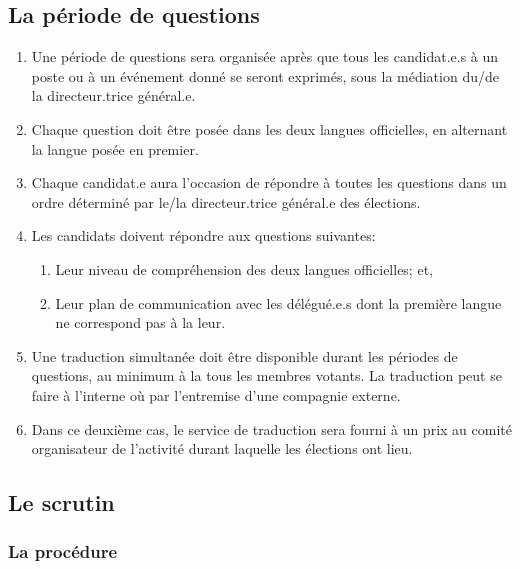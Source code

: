 \subsection{La période de questions}
\label{la-periode-de-questions}

\begin{enumerate}
 \item
  Une période de questions sera organisée après que tous les candidat.e.s à un poste ou à un événement donné se seront exprimés, sous la médiation du/de la directeur.trice général.e.
 \item
  Chaque question doit être posée dans les deux langues officielles, en alternant la langue posée en premier.
 \item
  Chaque candidat.e aura l'occasion de répondre à toutes les questions dans un ordre déterminé par le/la directeur.trice général.e des élections.
 \item
  Les candidats doivent répondre aux questions suivantes:

  \begin{enumerate}
   \item
    Leur niveau de compréhension des deux langues officielles; et,
   \item
    Leur plan de communication avec les délégué.e.s dont la première langue ne correspond pas à la leur.
  \end{enumerate}
 \item
  Une traduction simultanée doit être disponible durant les périodes de questions, au minimum à la tous les membres votants. La traduction peut se faire à l'interne où par l'entremise d'une compagnie externe.
 \item
  Dans ce deuxième cas, le service de traduction sera fourni à un prix au comité organisateur de l'activité durant laquelle les élections ont lieu.
\end{enumerate}

\subsection{Le scrutin}
\label{le-scrutin}

\subsubsection{La procédure}
\label{la-procedure}

